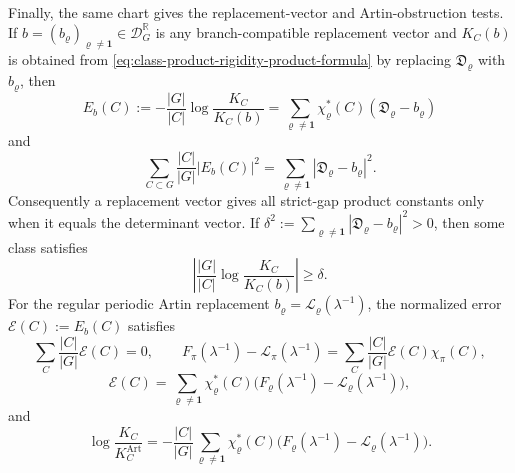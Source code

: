 \begin{corollary}
  Finally, the same chart gives the replacement-vector and Artin-obstruction
  tests.  If
  \(b=(b_\varrho)_{\varrho\ne\mathbf1}\in\mathcal D_G^{\mathbb R}\) is any
  branch-compatible replacement vector and \(K_C(b)\) is obtained from
  \eqref{eq:class-product-rigidity-product-formula} by replacing
  \(\mathfrak D_\varrho\) with \(b_\varrho\), then
  \begin{equation}\label{eq:classical-layer-replacement-error}
    E_b(C):=-\frac{|G|}{|C|}\log\frac{K_C}{K_C(b)}
    =
    \sum_{\varrho\ne\mathbf1}
      \chi_\varrho^\ast(C)(\mathfrak D_\varrho-b_\varrho)
  \end{equation}
  and
  \begin{equation}\label{eq:class-product-rigidity-replacement-parseval}
    \sum_{C\subset G}\frac{|C|}{|G|}|E_b(C)|^2
    =
    \sum_{\varrho\ne\mathbf1}|\mathfrak D_\varrho-b_\varrho|^2 .
  \end{equation}
  \label{eq:adams-obstruction-bound-parseval}
  Consequently a replacement vector gives all strict-gap product constants
  only when it equals the determinant vector.  If
  \(\delta^2:=\sum_{\varrho\ne\mathbf1}|\mathfrak D_\varrho-b_\varrho|^2>0\),
  then some class satisfies
  \begin{equation}\label{eq:class-product-rigidity-class-lower-bound}
    \left|\frac{|G|}{|C|}\log\frac{K_C}{K_C(b)}\right|
    \ge \delta .
  \end{equation}
  For the regular periodic Artin replacement
  \(b_\varrho=\mathcal L_\varrho(\lambda^{-1})\), the normalized error
  \(\mathcal E(C):=E_b(C)\) satisfies
  \begin{equation}\label{eq:adams-obstruction-bound-zero-mean}
    \sum_C\frac{|C|}{|G|}\mathcal E(C)=0,\qquad
    F_\pi(\lambda^{-1})-\mathcal L_\pi(\lambda^{-1})
    =
    \sum_C\frac{|C|}{|G|}\mathcal E(C)\chi_\pi(C),
  \end{equation}
  \begin{equation}\label{eq:adams-obstruction-bound-forward}
    \mathcal E(C)=
    \sum_{\varrho\ne\mathbf1}\chi_\varrho^\ast(C)
    \bigl(F_\varrho(\lambda^{-1})
      -\mathcal L_\varrho(\lambda^{-1})\bigr),
  \end{equation}
  \label{eq:fixed-coordinate-support-error-bound}
  and
  \begin{equation}\label{eq:adams-obstruction-ratio}
    \log\frac{K_C}{K_C^{\mathrm{Art}}}
    =
    -\frac{|C|}{|G|}
    \sum_{\varrho\ne\mathbf1}\chi_\varrho^\ast(C)
    \bigl(F_\varrho(\lambda^{-1})
      -\mathcal L_\varrho(\lambda^{-1})\bigr).
  \end{equation}

\end{corollary}
